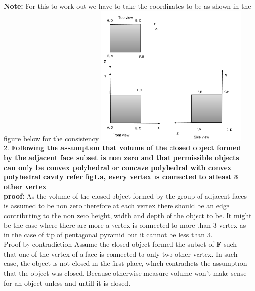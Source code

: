 \\
\textbf{Note:} For this to work out we have to take the coordinates to be as shown in the figure below for the consistency
\includegraphics[height = 7cm]{gg.png}\\

2. \textbf{Following the  assumption that volume of the closed object  formed by the adjacent face subset is non zero and that permissible objects can only be convex polyhedral or concave polyhedral with convex polyhedral cavity refer fig1.a, every vertex is connected to atleast 3 other vertex}\\ 

\textbf{proof:} 
As the volume of the closed object formed by the group of adjacent faces is assumed to be non zero therefore at each vertex there should be an edge contributing to the non zero height, width and depth of the object to be. It might be the case where there are more a vertex is connected to more than 3 vertex as in the case of tip of pentagonal pyramid but it cannot be less than 3.\\
Proof by contradiction \: Assume the closed object formed the subset of \textbf{F} such that one of the vertex of a face is connected to only two other vertex. In such case, the object is not closed in the first place, which contradicts the assumption that the  object was closed. Because otherwise measure volume won't make sense for an object unless and untill it is closed. \\

